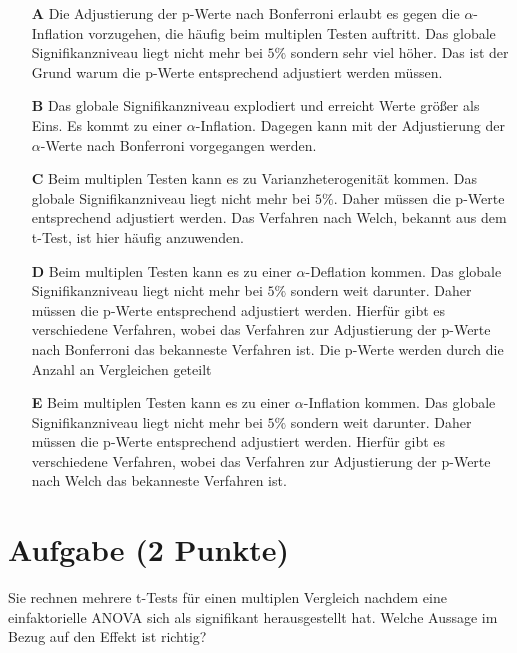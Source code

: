 \documentclass[a4paper, 9pt]{scrartcl}\usepackage[]{graphicx}\usepackage[]{xcolor}
\begin{document}
\begin{enumerate}
\item [\textbf{A} \msquare] Die Adjustierung der p-Werte nach Bonferroni erlaubt es gegen die $\alpha$-Inflation vorzugehen, die häufig beim multiplen Testen auftritt. Das globale Signifikanzniveau liegt nicht mehr bei $5\%$ sondern sehr viel höher. Das ist der Grund warum die p-Werte entsprechend adjustiert werden müssen.
\item [\textbf{B} \msquare] Das globale Signifikanzniveau explodiert und erreicht Werte größer als Eins. Es kommt zu einer $\alpha$-Inflation. Dagegen kann mit der Adjustierung der $\alpha$-Werte nach Bonferroni vorgegangen werden.
\item [\textbf{C} \msquare] Beim multiplen Testen kann es zu Varianzheterogenität kommen. Das globale Signifikanzniveau liegt nicht mehr bei $5\%$. Daher müssen die p-Werte entsprechend adjustiert werden. Das Verfahren nach Welch, bekannt aus dem t-Test, ist hier häufig anzuwenden.
\item [\textbf{D} \msquare] Beim multiplen Testen kann es zu einer $\alpha$-Deflation kommen. Das globale Signifikanzniveau liegt nicht mehr bei $5\%$ sondern weit darunter. Daher müssen die p-Werte entsprechend adjustiert werden. Hierfür gibt es verschiedene Verfahren, wobei das Verfahren zur Adjustierung der p-Werte nach Bonferroni das bekanneste Verfahren ist. Die p-Werte werden durch die Anzahl an Vergleichen geteilt
\item [\textbf{E} \msquare] Beim multiplen Testen kann es zu einer $\alpha$-Inflation kommen. Das globale Signifikanzniveau liegt nicht mehr bei $5\%$ sondern weit darunter. Daher müssen die p-Werte entsprechend adjustiert werden. Hierfür gibt es verschiedene Verfahren, wobei das Verfahren zur Adjustierung der p-Werte nach Welch das bekanneste Verfahren ist.
\end{enumerate}

\section{Aufgabe \hfill (2 Punkte)}




Sie rechnen mehrere t-Tests für einen multiplen Vergleich nachdem eine einfaktorielle ANOVA sich als signifikant herausgestellt hat. Welche Aussage im Bezug auf den Effekt ist richtig? 
\end{document}
